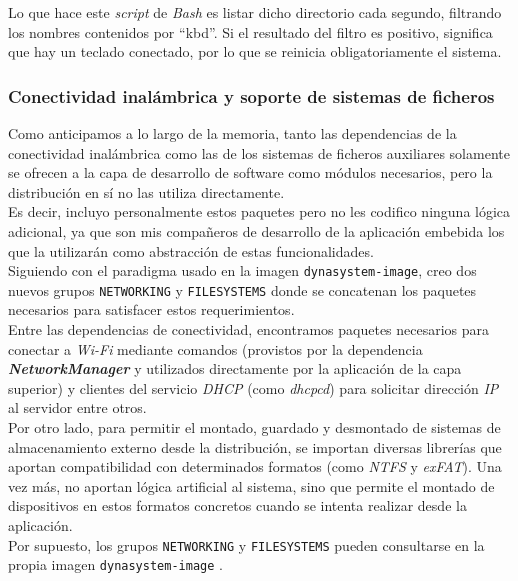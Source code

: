 Lo que hace este \textit{script} de \textit{Bash} es listar dicho directorio cada segundo, filtrando los nombres contenidos por ``kbd''. Si el resultado del filtro es positivo, significa que hay un teclado conectado, por lo que se reinicia obligatoriamente el sistema.

\subsubsection{Conectividad inalámbrica y soporte de sistemas de ficheros}

Como anticipamos a lo largo de la memoria, tanto las dependencias de la conectividad inalámbrica como las de los sistemas de ficheros auxiliares solamente se ofrecen a la capa de desarrollo de software como módulos necesarios, pero la distribución en sí no las utiliza directamente.\\

Es decir, incluyo personalmente estos paquetes pero no les codifico ninguna lógica adicional, ya que son mis compañeros de desarrollo de la aplicación embebida los que la utilizarán como abstracción de estas funcionalidades.\\

Siguiendo con el paradigma usado en la imagen \texttt{dynasystem-image}, creo dos nuevos grupos \texttt{NETWORKING} y \texttt{FILESYSTEMS} donde se concatenan los paquetes necesarios para satisfacer estos requerimientos.\\

Entre las dependencias de conectividad, encontramos paquetes necesarios para conectar a \textit{Wi-Fi} mediante comandos (provistos por la dependencia \textbf{\textit{NetworkManager}} y utilizados directamente por la aplicación de la capa superior) y clientes del servicio \textit{DHCP} (como \textit{dhcpcd}) para solicitar dirección \textit{IP} al servidor entre otros.\\

Por otro lado, para permitir el montado, guardado y desmontado de sistemas de almacenamiento externo desde la distribución, se importan diversas librerías que aportan compatibilidad con determinados formatos (como \textit{NTFS} y \textit{exFAT}). Una vez más, no aportan lógica artificial al sistema, sino que permite el montado de dispositivos en estos formatos concretos cuando se intenta realizar desde la aplicación.\\

Por supuesto, los grupos \texttt{NETWORKING} y \texttt{FILESYSTEMS} pueden consultarse en la propia imagen \texttt{dynasystem-image} \cite{dynasystem-image}.


